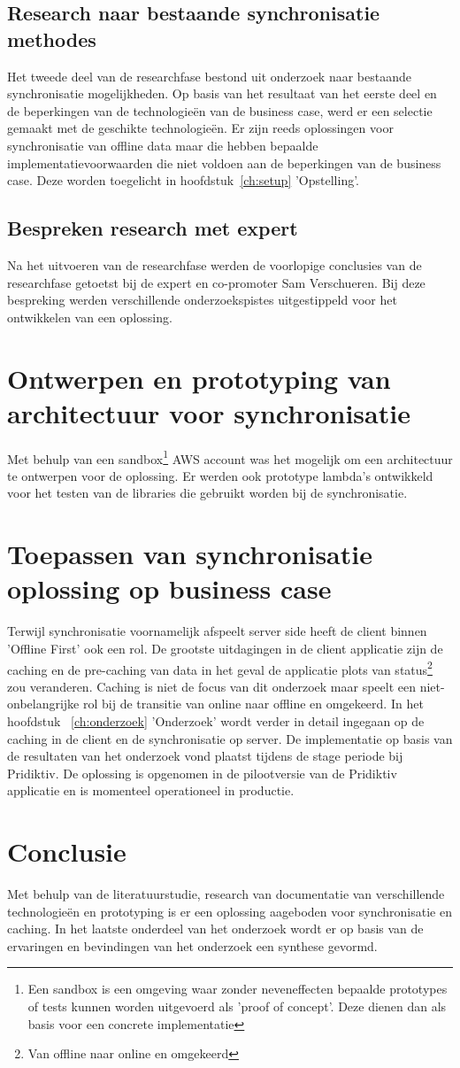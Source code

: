 \subsection{Research naar bestaande synchronisatie methodes}
Het tweede deel van de researchfase bestond uit onderzoek naar bestaande synchronisatie mogelijkheden. Op basis van het resultaat van het eerste deel en de beperkingen van de technologie\"en van de business case, werd er een selectie gemaakt met de geschikte technologie\"en. Er zijn reeds oplossingen voor synchronisatie van offline data maar die hebben bepaalde implementatievoorwaarden die niet voldoen aan de beperkingen van de business case. Deze worden toegelicht in hoofdstuk~\ref{ch:setup} 'Opstelling'.
\subsection{Bespreken research met expert}
Na het uitvoeren van de researchfase werden de voorlopige conclusies van de researchfase getoetst bij de expert en co-promoter Sam Verschueren. Bij deze bespreking werden verschillende onderzoekspistes uitgestippeld voor het ontwikkelen van een oplossing.
\section{Ontwerpen en prototyping van architectuur voor synchronisatie}
Met behulp van een sandbox\footnote{Een sandbox is een omgeving waar zonder neveneffecten bepaalde prototypes of tests kunnen worden uitgevoerd als 'proof of concept'. Deze dienen dan als basis voor een concrete implementatie} AWS account was het mogelijk om een architectuur te ontwerpen voor de oplossing. Er werden ook prototype lambda's ontwikkeld voor het testen van de libraries die gebruikt worden bij de synchronisatie.
\clearpage
\section{Toepassen van synchronisatie oplossing op business case}
Terwijl synchronisatie voornamelijk afspeelt server side heeft de client binnen 'Offline First' ook een rol. De grootste uitdagingen in de client applicatie zijn de caching en de pre-caching van data in het geval de applicatie plots van status\footnote{Van offline naar online en omgekeerd} zou veranderen. Caching is niet de focus van dit onderzoek maar speelt een niet-onbelangrijke rol bij de transitie van online naar offline en omgekeerd. In het hoofdstuk ~\ref{ch:onderzoek} 'Onderzoek' wordt verder in detail ingegaan op de caching in de client en de synchronisatie op server. De implementatie op basis van de resultaten van het onderzoek vond plaatst tijdens de stage periode bij Pridiktiv. De oplossing is opgenomen in de pilootversie van de Pridiktiv applicatie en is momenteel operationeel in productie.
\section{Conclusie}
Met behulp van de literatuurstudie, research van documentatie van verschillende technologie\"en en prototyping is er een oplossing aageboden voor synchronisatie en caching. In het laatste onderdeel van het onderzoek wordt er op basis van de ervaringen en bevindingen van het onderzoek een synthese gevormd.